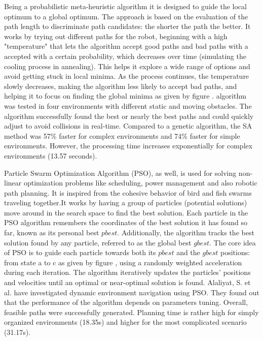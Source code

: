 Being a probabilistic meta-heuristic algorithm it is designed to guide the local
optimum to a global optimum. The approach is based on the evaluation of the path length to discriminate 
path candidates: the shorter the path the better. It works by trying out different paths for the robot, beginning 
with a high "temperature" that lets the algorithm accept good paths and bad paths with a accepted with a certain probability,
which decreases over time (simulating the cooling process in annealing). This helps it explore a wide range of 
options and avoid getting stuck in local minima. As the process continues, the temperature slowly decreases, 
making the algorithm less likely to accept bad paths, and helping it to focus on finding the global minima as given by 
figure . algorithm was tested in four environments with different static and moving obstacles. The algorithm 
successfully found the best or nearly the best paths and could quickly adjust to avoid collisions in real-time. 
Compared to a genetic algorithm, the SA method was 57\% faster for complex environments and 74\% faster for simple
environments. However, the processing time increases exponentially for complex environments (13.57 seconds).

Particle Swarm Optimization Algorithm (PSO), as well, is used for solving non-linear optimization problems like scheduling, power 
management and also robotic path planning. It is inspired from the cohesive behavior of bird and fish swarms traveling 
together.It works by having a group of particles (potential solutions) move around in the search space to find the best 
solution. Each particle in the PSO algorithm remembers the coordinates of the best solution it has found so far, known 
as its personal best \(pbest\). Additionally, the algorithm tracks the best solution found by any particle, referred to as 
the global best \(gbest\). The core idea of PSO is to guide each particle towards both its \(pbest\) and the \(gbest\) positions:
from state a to c as given by figure , 
using a randomly weighted acceleration during each iteration. The algorithm iteratively updates the particles' positions 
and velocities until an optimal or near-optimal solution is found.
Alaliyat, S. et al. have investigated dynamic environment navigation using PSO. They found out that the performance 
of the algorithm depends on parameters tuning. Overall, feasible paths were successfully generated.
Planning time is rather high for simply organized environments (18.35s) and higher for the most complicated scenario
(31.17s).

